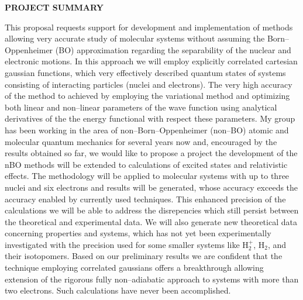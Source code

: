 \setlength{\textwidth}{7in}
\setlength{\textheight}{9.35in}
\setlength{\oddsidemargin}{-.25in}
\setlength{\topmargin}{-.2in}




\setlength{\baselineskip}{1em}


\noindent
{\bf PROJECT SUMMARY}

This proposal requests support for development and implementation
of methods allowing very accurate 
study of molecular systems without
assuming the Born--Oppenheimer (BO) approximation regarding the
separability of the nuclear and electronic motions. In this
approach we will employ explicitly  
correlated cartesian gaussian functions,
which very effectively described 
quantum states of systems consisting of 
interacting particles (nuclei and electrons).
The very high accuracy of the method to achieved
by employing the variational method and optimizing
both linear and non--linear parameters of the
wave function using analytical derivatives of the
the energy functional with respect these parameters. 
My group has been working in the area of 
non--Born--Oppenheimer (non--BO)
atomic and molecular quantum mechanics 
for several years now and, encouraged by the 
results obtained so far, we would like to propose a
project the development of the nBO methods
will be extended to calculations of excited states and
relativistic effects.
The methodology will be applied to molecular systems
with up to three nuclei and six electrons and
results will be generated, whose accuracy exceeds
the accuracy enabled by currently used techniques.
This enhanced precision of the calculations 
we will be able to address the disrepencies which
still persist between the theoretical and experimental data.
We will also generate new theoretical data
concerning properties and systems, 
which has not yet been experimentally investigated
with the precision used for some smaller systems like
H$_2^+$, H$_2$, and their isotopomers.
Based on our preliminary results we are confident
that the technique employing correlated gaussians
offers a breakthrough allowing extension of the
rigorous fully non--adiabatic approach
to systems with more than two
electrons. 
Such calculations have never been accomplished.

